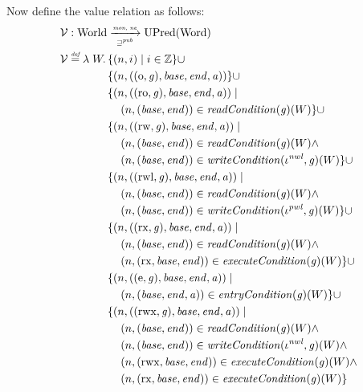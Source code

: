 \documentclass[a4paper]{article}
\newcommand{\defeq}{\stackrel{\textit{\tiny{def}}}{=}}
\newcommand{\union}{\mathbin{\cup}}
\newcommand{\var}[1]{\mathit{#1}}
\newcommand{\gl}{\var{g}}
\newcommand{\addr}{\var{a}}
\newcommand{\start}{\var{base}}
\newcommand{\addrend}{\var{end}}
\newcommand{\perm}{\var{perm}}
\newcommand{\stdcap}[1][(\perm,\gl)]{\left(#1,\start,\addrend,\addr \right)}
\newcommand{\plainfun}[2]{
  \ifthenelse{\equal{#2}{}}
             {\mathit{#1}}
             {\mathit{#1}(#2)}
}
\newcommand{\readCond}[1]{\plainfun{readCondition}{#1}}
\newcommand{\writeCond}[1]{\plainfun{writeCondition}{#1}}
\newcommand{\execCond}[1]{\plainfun{executeCondition}{#1}}
\newcommand{\entryCond}[1]{\plainfun{entryCondition}{#1}}
\newcommand{\futurewk}{\mathbin{\sqsupseteq}^{\var{pub}}}
\newcommand{\monwknefun}{\xrightarrow[\text{\tiny{$\futurewk$}}]{\textit{\tiny{mon, ne}}}}
\newcommand{\asmType}{\plaindom{AsmType}}
\newcommand{\plaindom}[1]{\mathrm{#1}}
\newcommand{\Words}{\plaindom{Word}}
\newcommand{\ints}{\mathbb{Z}}
\newcommand{\Worlds}{\plaindom{World}}
\newcommand{\UPred}[1]{\plaindom{UPred}(#1)}
\newcommand{\intr}[2]{\mathcal{#1}}
\newcommand{\valueintr}[1]{\intr{V}{#1}}
\newcommand{\stdvr}{\valueintr{\asmType}}
\newcommand{\npair}[2][n]{\left(#1,#2 \right)}
\newcommand{\plainperm}[1]{\mathrm{#1}}
\newcommand{\noperm}{\plainperm{o}}
\newcommand{\readonly}{\plainperm{ro}}
\newcommand{\readwrite}{\plainperm{rw}}
\newcommand{\exec}{\plainperm{rx}}
\newcommand{\entry}{\plainperm{e}}
\newcommand{\rwx}{\plainperm{rwx}}
\newcommand{\readwritel}{\plainperm{rwl}}
\begin{document}
Now define the value relation as follows:
\begin{align*}
  &\stdvr : \Worlds \monwknefun \UPred{\Words} \\
  &\stdvr\defeq \lambda \; W \ldotp 
           \begin{aligned}[t]
             & \{ \npair{i} \mid i \in \ints \} 
             \union \\
             & \{ \npair{\stdcap[(\noperm,\gl)] }  \} 
             \union \\
             & \{ \npair{\stdcap[(\readonly,\gl)] } \mid \\
             & \quad \npair{(\start,\addrend)} \in \readCond{}(\gl)(W)\} 
             \union \\
             & \{ \npair{\stdcap[(\readwrite,\gl)] } \mid \\
             & \quad \npair{(\start,\addrend)} \in \readCond{}(\gl)(W) \land \\
             & \quad \npair{(\start,\addrend)} \in \writeCond{}(\iota^{\var{nwl}},\gl)(W) \}
             \union \\
             & \{ \npair{\stdcap[(\readwritel,\gl)] } \mid \\
             & \quad \npair{(\start,\addrend)} \in \readCond{}(\gl)(W) \land \\
             & \quad \npair{(\start,\addrend)} \in \writeCond{}(\iota^{\var{pwl}},\gl)(W) \}
             \union \\
             & \{ \npair{\stdcap[(\exec,\gl)]} \mid \\
             & \quad \npair{(\start,\addrend)} \in \readCond{}(\gl)(W) \land \\
             & \quad \npair{(\exec,\start,\addrend)} \in \execCond{}(\gl)(W) \} 
             \union \\
             & \{ \npair{\stdcap[(\entry,\gl)]} \mid \\
             & \quad \npair{(\start,\addrend,\addr)} \in \entryCond{}(\gl)(W)\} 
             \union \\
             & \{ \npair{\stdcap[(\rwx,\gl)]} \mid \\
             & \quad \npair{(\start,\addrend)} \in \readCond{}(\gl)(W) \land \\
             & \quad \npair{(\start,\addrend)} \in \writeCond{}(\iota^{\var{nwl}},\gl)(W) \land\\
             & \quad \npair{(\rwx,\start,\addrend)} \in \execCond{}(\gl)(W)  \land \\
             & \quad \npair{(\exec,\start,\addrend)} \in \execCond{}(\gl)(W) \}

\end{aligned}
\end{align*}
\end{document}
